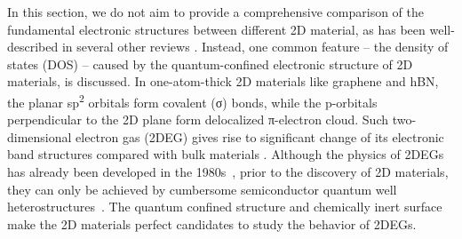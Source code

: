 %
In this section, we do not aim to provide a comprehensive comparison
of the fundamental electronic structures between different 2D
material, as has been well-described in several other reviews
\autocite{Neto_2009_Electron_gr_rev,Mas_Ballest_2011_review,Das_Sarma_2011_electron_gr,Butler_2013_review,Bhimanapati_2015_2D_rev,Novoselov_2016_vdW}.
%
Instead, one common feature -- the density of states (DOS) -- caused
by the quantum-confined electronic structure of 2D materials, is
discussed.
%
In
one-atom-thick 2D materials like graphene and hBN, the planar
sp\textsuperscript{2} orbitals form covalent (σ) bonds, while the
p-orbitals perpendicular to the 2D plane form delocalized π-electron
cloud\nocite{Ihn_2009_book}.
%
Such two-dimensional
electron gas (2DEG) gives rise to significant change of its electronic
band structures compared with bulk materials \autocite{Davies_1997_book}.
%
Although the physics of 2DEGs has already been developed in the
1980s~\autocite{Ando_1982_electron_2D}, prior to the discovery of 2D
materials, they can only be achieved by cumbersome semiconductor
quantum well
heterostructures~\autocite{Ihn_2009_book,Davies_1997_book}. The quantum
confined structure and chemically inert surface make the 2D materials
perfect candidates to study the behavior of 2DEGs.


